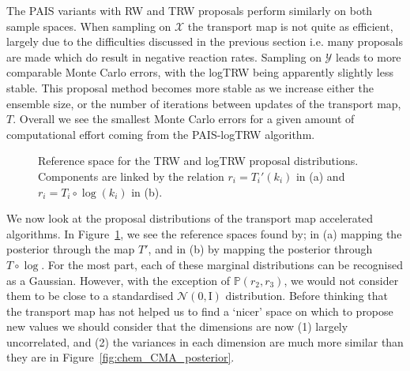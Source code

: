 \documentclass[final]{siamltex}
\begin{document}
The PAIS variants with RW and TRW proposals perform similarly on both sample spaces. When sampling on $\mathcal{X}$ the transport map is not quite as efficient, largely due to the difficulties discussed in the previous section i.e. many proposals are made which do result in negative reaction rates. Sampling on $\mathcal{Y}$ leads to more comparable Monte Carlo errors, with the logTRW being apparently slightly less stable. This proposal method becomes more stable as we increase either the ensemble size, or the number of iterations between updates of the transport map, $T$. Overall we see the smallest Monte Carlo errors for a given amount of computational effort coming from the PAIS-logTRW algorithm.

\begin{figure}[!htb]
\centering
{}
\caption{Reference space for the TRW and logTRW proposal distributions. Components are linked by the relation $r_i = T_i'(k_i)$ in (a) and $r_i = T_i\circ\log(k_i)$ in (b).}
\label{fig:chem_reference_spaces}
\end{figure}

We now look at the proposal distributions of the transport map accelerated algorithms. In Figure~\ref{fig:chem_reference_spaces}, we see the reference spaces found by; in (a) mapping the posterior through the map $T'$, and in (b) by mapping the posterior through $T\circ\log$. For the most part, each of these marginal distributions can be recognised as a Gaussian. However, with the exception of $\mathbb{P}(r_2,r_3)$, we would not consider them to be close to a standardised $\mathcal{N}(0, \text{I})$ distribution. Before thinking that the transport map has not helped us to find a `nicer' space on which to propose new values we should consider that the dimensions are now (1) largely uncorrelated, and (2) the variances in each dimension are much more similar than they are in Figure~\ref{fig:chem_CMA_posterior}.
\end{document}
